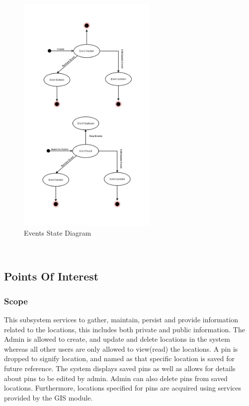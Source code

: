 \documentclass{article}
\begin{document}
    
    \begin{figure}[h!]
        \begin{center}
            \includegraphics[width=0.6\textwidth]{StateDiagramEvent.jpg} \caption{Events State Diagram}
        \end{center}
    \end{figure}
    
    \mbox{}\\
    \bigskip
    \clearpage
    \newpage
    
\subsection{Points Of Interest}
\subsubsection{Scope}
This subsystem services to gather, maintain, persist and provide information related to the locations, this includes both private and public information. The Admin is allowed to create, and update and delete locations in the system whereas all other users are only allowed to view(read) the locations.
A pin is dropped to signify location, and named as that specific location is saved for future reference. The system displays saved pins as well as allows for details about pins to be edited by admin. Admin can also delete pins from saved locations. Furthermore, locations specified for pins are acquired using services provided by the GIS module.
\end{document}
